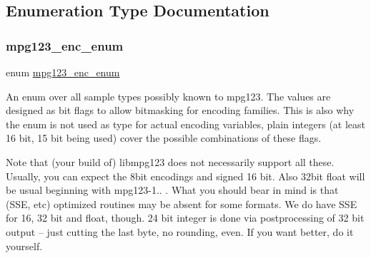 \subsection{Enumeration Type Documentation}
\mbox{\label{group__mpg123__enc_gafc8cdd60a8d3c30a09249869d835c634}} 
\subsubsection{\texorpdfstring{mpg123\_enc\_enum}{mpg123\_enc\_enum}}
{\footnotesize\ttfamily enum \mbox{\hyperlink{group__mpg123__enc_gafc8cdd60a8d3c30a09249869d835c634}{mpg123\+\_\+enc\+\_\+enum}}}

An enum over all sample types possibly known to mpg123. The values are designed as bit flags to allow bitmasking for encoding families. This is also why the enum is not used as type for actual encoding variables, plain integers (at least 16 bit, 15 bit being used) cover the possible combinations of these flags.

Note that (your build of) libmpg123 does not necessarily support all these. Usually, you can expect the 8bit encodings and signed 16 bit. Also 32bit float will be usual beginning with mpg123-\/1.. . What you should bear in mind is that (S\+SE, etc) optimized routines may be absent for some formats. We do have S\+SE for 16, 32 bit and float, though. 24 bit integer is done via postprocessing of 32 bit output -- just cutting the last byte, no rounding, even. If you want better, do it yourself.

